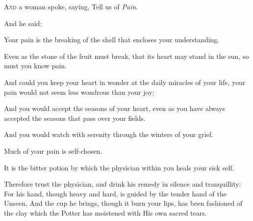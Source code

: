 \lettrine{A}{nd} a woman spoke, saying, Tell us
of \textit{Pain}.

\bigskip
And he said:

Your pain is the breaking of the shell
that encloses your understanding.

Even as the stone of the fruit must
break, that its heart may stand in the
sun, so must you know pain.

And could you keep your heart in wonder
at the daily miracles of your life, your
pain would not seem less wondrous than
your joy;

And you would accept the seasons of your
heart, even as you have always accepted
the seasons that pass over your fields.

And you would watch with serenity
through the winters of your grief.

Much of your pain is self-chosen.

It is the bitter potion by which the
physician within you heals your sick
self.

Therefore trust the physician, and drink
his remedy in silence and tranquillity:
For his hand, though heavy and hard, is
guided by the tender hand of the Unseen,
And the cup he brings, though it burn
your lips, has been fashioned of the
clay which the Potter has moistened with
His own sacred tears.
